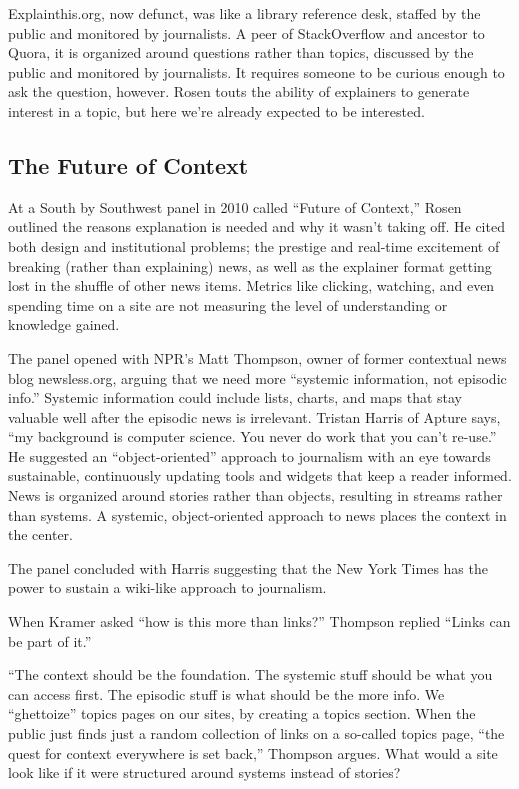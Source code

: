 Explainthis.org, now defunct, was like a library reference desk, staffed by the public and monitored by journalists. A peer of StackOverflow and ancestor to Quora, it is organized around questions rather than topics, discussed by the public and monitored by journalists. It requires someone to be curious enough to ask the question, however. Rosen touts the ability of explainers to generate interest in a topic, but here we're already expected to be interested.

\subsection{The Future of Context}

At a South by Southwest panel in 2010 called ``Future of Context,'' Rosen outlined the reasons explanation is needed and why it wasn't taking off. He cited both design and institutional problems; the prestige and real-time excitement of breaking (rather than explaining) news, as well as the explainer format getting lost in the shuffle of other news items.\autocite{rosen_2010} Metrics like clicking, watching, and even spending time on a site are not measuring the level of understanding or knowledge gained.

The panel opened with NPR's Matt Thompson, owner of former contextual news blog newsless.org, arguing that we need more ``systemic information, not episodic info.'' Systemic information could include lists, charts, and maps that stay valuable well after the episodic news is irrelevant. Tristan Harris of Apture says, ``my background is computer science. You never do work that you can't re-use.'' He suggested an ``object-oriented'' approach to journalism with an eye towards sustainable, continuously updating tools and widgets that keep a reader informed. News is organized around stories rather than objects, resulting in streams rather than systems. A systemic, object-oriented approach to news places the context in the center.

The panel concluded with Harris suggesting that the New York Times has the power to sustain a wiki-like approach to journalism.

When Kramer asked ``how is this more than links?'' Thompson replied ``Links can be part of it.''


``The context should be the foundation. The systemic stuff should be what you can access first. The episodic stuff is what should be the more info. We “ghettoize” topics pages on our sites, by creating a topics section. When the public just finds just a random collection of links on a so-called topics page, “the quest for context everywhere is set back,” Thompson argues. What would a site look like if it were structured around systems instead of stories?

